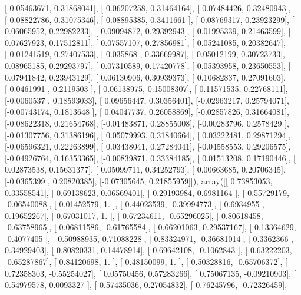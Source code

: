 \documentclass{article}
\begin{document}
       [-0.05463671,  0.31868041],
       [-0.06207258,  0.31464164],
       [ 0.07484426,  0.32480943],
       [-0.08822786,  0.31075346],
       [-0.08895385,  0.3411661 ],
       [ 0.08769317,  0.23923299],
       [ 0.06065952,  0.22982233],
       [ 0.09094872,  0.29392943],
       [-0.01995339,  0.21463599],
       [ 0.07627923,  0.17512811],
       [-0.07557107,  0.27856981],
       [-0.05241085,  0.20382647],
       [-0.01241519,  0.27407533],
       [-0.035868  ,  0.33669987],
       [ 0.05012199,  0.30723733],
       [ 0.08965185,  0.29293797],
       [ 0.07310589,  0.17420778],
       [-0.05393958,  0.23650553],
       [ 0.07941842,  0.23943129],
       [ 0.06130906,  0.30939373],
       [ 0.10682837,  0.27091603],
       [-0.0461991 ,  0.2119503 ],
       [-0.06138975,  0.15008307],
       [ 0.11571535,  0.22768111],
       [-0.0060537 ,  0.18593033],
       [ 0.09656447,  0.30356401],
       [-0.02963217,  0.25794071],
       [-0.00743174,  0.1813648 ],
       [ 0.04047737,  0.26058869],
       [-0.02857826,  0.31664081],
       [-0.08622318,  0.21654768],
       [-0.01483871,  0.28855008],
       [-0.00283796,  0.2578429 ],
       [-0.01307756,  0.31386196],
       [ 0.05079993,  0.31840664],
       [ 0.03222481,  0.29871294],
       [-0.06596321,  0.22263899],
       [ 0.03438041,  0.27284041],
       [-0.04558553,  0.29206575],
       [-0.04926764,  0.16353365],
       [-0.00839871,  0.33384185],
       [ 0.01513208,  0.17190446],
       [ 0.02873538,  0.15631377],
       [ 0.05099711,  0.34252793],
       [ 0.00663685,  0.20706345],
       [-0.0365399 ,  0.20820385],
       [-0.07305645,  0.21855959]]), array([[ 0.73853053,  0.33558541],
       [-0.69138623,  0.06569401],
       [ 0.29193984,  0.6981164 ],
       [-0.55729179, -0.06540088],
       [ 0.01452579,  1.        ],
       [ 0.44023539, -0.39994773],
       [-0.6934955 ,  0.19652267],
       [-0.67031017,  1.        ],
       [ 0.67234611, -0.65296025],
       [-0.80618458, -0.63758965],
       [ 0.06811586, -0.61765584],
       [-0.66201063,  0.29537167],
       [ 0.13364629, -0.4077405 ],
       [-0.50988935,  0.71088228],
       [-0.83324971, -0.36681014],
       [-0.3362366 ,  0.34929403],
       [ 0.80820331,  0.14478914],
       [ 0.69642108, -0.1062843 ],
       [-0.63222203, -0.65287867],
       [-0.84120698,  1.        ],
       [-0.48150099,  1.        ],
       [ 0.50328816, -0.65706372],
       [ 0.72358303, -0.55254027],
       [ 0.05750456,  0.57283266],
       [ 0.75067135, -0.09210903],
       [ 0.54979578,  0.0093327 ],
       [ 0.57435036,  0.27054832],
       [-0.76245796, -0.72326459],
\end{document}
